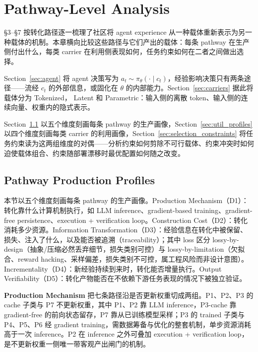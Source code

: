 \section{Pathway-Level Analysis}

§3–§7 按转化路径逐一梳理了社区将 agent experience 从一种载体重新表示为另一种载体的机制。本章横向比较这些路径与它们产出的载体：每条 pathway 在生产侧付出什么，每类 carrier 在利用侧表现如何，任务约束如何在二者之间做出选择。

Section~\ref{sec:agent} 将 agent 决策写为 $a_t \sim \pi_\theta(\cdot \mid c_t)$，经验影响决策只有两条途径——流经 $c_t$ 的外部信息，或固化在 $\theta$ 的内部能力。Section~\ref{sec:carriers} 据此将载体分为 Tokenized， Latent 和 Parametric：输入侧的离散 token、输入侧的连续向量、权重内的隐式表示。

Section~\ref{sec:prod_profiles} 以五个维度刻画每条 pathway 的生产画像，Section~\ref{sec:util_profiles} 以四个维度刻画每类 carrier 的利用画像，Section~\ref{sec:selection_constraints} 将任务约束读为这两组维度的对偶——分析约束如何剪除不可行载体、约束冲突时如何迫使载体组合、约束随部署漂移时最优配置如何随之改变。

\subsection{Pathway Production Profiles}
\label{sec:prod_profiles}

本节以五个维度刻画每条 pathway 的生产画像。Production Mechanism（D1）：转化靠什么计算机制执行，如 LLM inference、gradient-based training、gradient-free persistence、execution + verification loop。Construction Cost（D2）：转化消耗多少资源。Information Transformation（D3）：经验信息在转化中被保留、损失、注入了什么，以及能否被追溯（traceability）；其中 loss 区分 lossy-by-design（抽象/压缩必然丢弃细节，损失类别可控）与 lossy-by-limitation（欠拟合、reward hacking、采样偏差，损失类别不可控，属工程风险而非设计意图）。Incrementality（D4）：新经验持续到来时，转化能否增量执行。Output Verifiability（D5）：转化产物能否在不依赖下游任务表现的情况下被独立验证。



\textbf{Production Mechanism} 把七条路径沿是否更新权重切成两组。P1、P2、P3 的 cache 子类与 P7 不更新权重，其中 P1、P2 靠 LLM inference，P3-cache 靠 gradient-free 的前向状态留存，P7 靠从已训练模型采样；P3 的 trained 子类与 P4、P5、P6 经 gradient training，需数据筹备与优化的整套机制，单步资源消耗高于一次 inference。P2 在 inference 之外可叠加 execution + verification loop，是不更新权重一侧唯一带客观产出闸门的机制。

